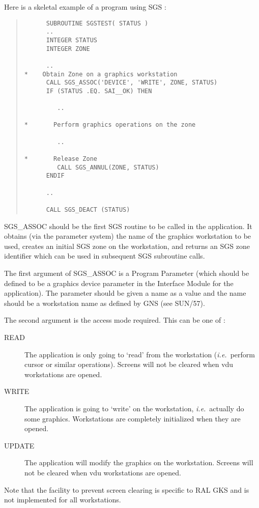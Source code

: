 Here is a skeletal example of a program using SGS :
\begin{quote}
\begin{verbatim}
      SUBROUTINE SGSTEST( STATUS )
      ..
      INTEGER STATUS
      INTEGER ZONE

      ..
*    Obtain Zone on a graphics workstation
      CALL SGS_ASSOC('DEVICE', 'WRITE', ZONE, STATUS)
      IF (STATUS .EQ. SAI__OK) THEN

         ..

*       Perform graphics operations on the zone

         ..

*       Release Zone
         CALL SGS_ANNUL(ZONE, STATUS)
      ENDIF

      ..

      CALL SGS_DEACT (STATUS)

\end{verbatim}
\end{quote}

SGS\_ASSOC should be the first SGS routine to be called in the application.
It obtains (via the parameter system) the name of the graphics workstation
to be used, creates an initial SGS zone on the workstation, and returns an
SGS zone identifier which can be used in subsequent SGS subroutine calls.

The first argument of SGS\_ASSOC is a Program Parameter (which should be defined
to be a graphics device parameter in the Interface Module for the application).
The parameter should be given a name as a value and the name should be a
workstation name as defined by GNS (see SUN/57).

The second argument is the access mode required. This can be one of :
\begin{description}
\item[READ]   The application is only going to `read' from the workstation
({\em i.e.}\ perform cursor or similar operations).
Screens will not be cleared when vdu workstations are opened.
\item[WRITE]  The application is going to `write' on the workstation,
{\em i.e.}\ actually do some graphics.
Workstations are completely initialized when they are opened.
\item[UPDATE] The application will modify the graphics on the workstation.
Screens will not be cleared when vdu workstations are opened.
\end{description}

Note that the facility to prevent screen clearing is specific to RAL GKS and
is not implemented for all workstations.

